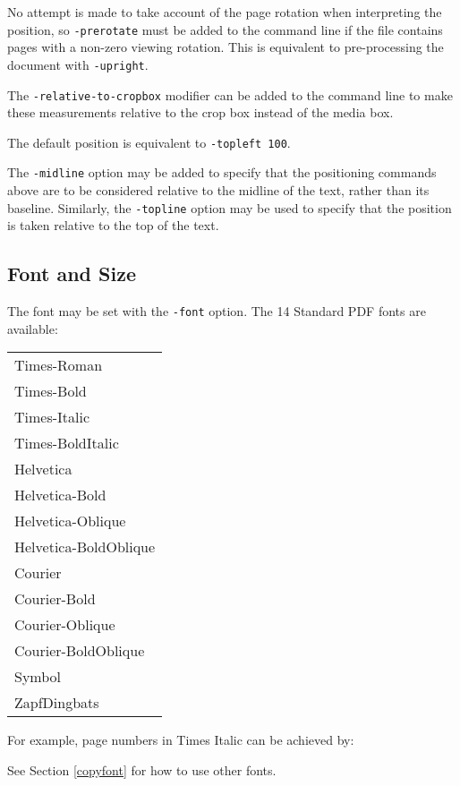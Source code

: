\documentclass{book}
\begin{document}
\noindent No attempt is made to take account of the page rotation when interpreting the
position, so \texttt{-prerotate} must be added to the command line if the file
contains pages with a non-zero viewing rotation. This is equivalent to
pre-processing the document with \texttt{-upright}.
   
The \texttt{-relative-to-cropbox} modifier can be added to the command line to
make these measurements relative to the crop box instead of the media box.

The default position is equivalent to \texttt{-topleft 100}.

The \texttt{-midline} option may be added to specify that the positioning
commands above are to be considered relative to the midline of the text, rather
than its baseline. Similarly, the \texttt{-topline} option may be used to specify that the position is taken relative to the top of the text.

  \subsection{Font and Size}
  The font may be set with the \texttt{-font} option. The 14 Standard PDF fonts are available:

  \vspace{2mm}
  \begin{tabular}{l}
  Times-Roman\\
  Times-Bold\\
  Times-Italic\\
  Times-BoldItalic\\
  Helvetica\\
  Helvetica-Bold\\
  Helvetica-Oblique\\
  Helvetica-BoldOblique\\
  Courier\\
  Courier-Bold\\
  Courier-Oblique\\
  Courier-BoldOblique\\
  Symbol\\
  ZapfDingbats
  \end{tabular}



  \noindent For example, page numbers in Times Italic can be achieved by:

\noindent{}
  \noindent See Section \ref{copyfont} for how to use other fonts.
\end{document}
